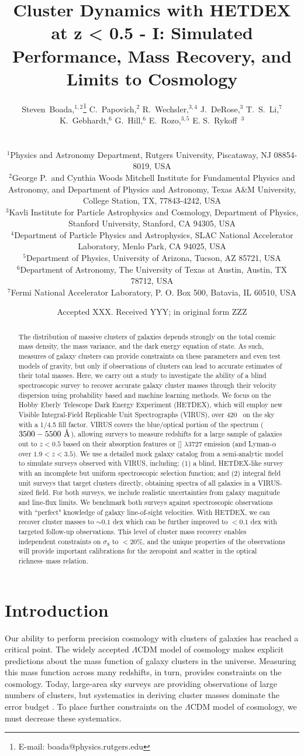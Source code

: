 \documentclass[fleqn,usenatbib]{mnras}
\title[Galaxy Clusters with HETDEX]{Cluster Dynamics with HETDEX at z < 0.5 - I: Simulated Performance, Mass Recovery, and Limits to Cosmology}
\author[S. Boada et al.]
{\parbox{\textwidth}{Steven~Boada,$^{1,2}$\thanks{E-mail: boada@physics.rutgers.edu}
C.~Papovich,$^{2}$
R.~Wechsler,$^{3,4}$
J.~DeRose,$^{3}$
T.~S.~Li,$^{7}$
K.~Gebhardt,$^{6}$
G.~Hill,$^{6}$
E.~Rozo,$^{3,5}$
E. S.~Rykoff~$^{3}$}\vspace{0.4cm}\
\\
\parbox{\textwidth}{$^{1}$Physics and Astronomy Department, Rutgers University, Piscataway, NJ 08854-8019, USA\\
$^{2}$George P.\ and Cynthia Woods Mitchell Institute for Fundamental Physics and Astronomy, and Department of Physics and Astronomy, Texas A\&M University, College Station, TX, 77843-4242, USA\\
$^{3}$Kavli Institute for Particle Astrophysics and Cosmology, Department of Physics, Stanford University, Stanford, CA 94305, USA\\
$^{4}$Department of Particle Physics and Astrophysics, SLAC National Accelerator Laboratory, Menlo Park, CA 94025, USA\\
$^{5}$Department of Physics, University of Arizona, Tucson, AZ 85721, USA\\
$^{6}$Department of Astronomy, The University of Texas at Austin, Austin, TX 78712, USA\\
$^{7}$Fermi National Accelerator Laboratory, P. O. Box 500, Batavia, IL 60510, USA}}
\date{Accepted XXX. Received YYY; in original form ZZZ}
\begin{document}
\label{firstpage}
\pagerange{\pageref{firstpage}--\pageref{lastpage}}
\maketitle

\begin{abstract}
\noindent
The distribution of massive clusters of galaxies depends strongly on the total cosmic mass density, the mass variance, and the dark energy equation of state. As such, measures of galaxy clusters can provide constraints on these parameters and even test models of gravity, but only if observations of clusters can lead to accurate estimates of their total masses. Here, we carry out a study to investigate the ability of a blind spectroscopic survey to recover accurate galaxy cluster masses through their velocity dispersion using probability based and machine learning methods. We focus on the Hobby Eberly Telescope Dark Energy Experiment (HETDEX), which will employ new Visible Integral-Field Replicable Unit Spectrographs (VIRUS), over 420 \degsq\ on the sky with a 1/4.5 fill factor. VIRUS covers the blue/optical portion of the spectrum ($3500-5500~\hbox{\AA}$), allowing surveys to measure redshifts for a large sample of galaxies out to $z < 0.5$ based on their absorption features or [] $\lambda$3727 emission (and Lyman-$\alpha$ over $1.9 < z < 3.5$). We use a detailed mock galaxy catalog from a semi-analytic model to simulate surveys observed with VIRUS, including: (1) a blind, HETDEX-like survey with an incomplete but uniform spectroscopic selection function; and (2) integral field unit surveys that target clusters directly, obtaining spectra of all galaxies in a VIRUS-sized field. For both surveys, we include realistic uncertainties from galaxy magnitude and line-flux limits. We benchmark both surveys against spectroscopic observations with ``perfect" knowledge of galaxy line-of-sight velocities. With HETDEX, we can recover cluster masses to $\sim0.1$ dex which can be further improved to $<0.1$ dex with targeted follow-up observations. This level of cluster mass recovery enables independent constraints on $\sigma_8$ to $<20$\%, and the unique properties of the observations will provide important calibrations for the zeropoint and scatter in the optical richness--mass relation.
\end{abstract}

\section{Introduction}\label{sec: Introduction}
Our ability to perform precision cosmology with clusters of galaxies has reached a critical point. The widely accepted $\Lambda$CDM model of cosmology makes explicit predictions about the mass function of galaxy clusters in the universe. Measuring this mass function across many redshifts, in turn, provides constraints on the cosmology. Today, large-area sky surveys are providing observations of large numbers of clusters, but systematics in deriving cluster masses dominate the error budget . To place further constraints on the $\Lambda$CDM model of cosmology, we must decrease these systematics. 
\end{document}
